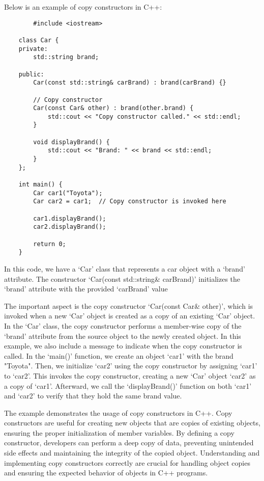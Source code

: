 \begin{solution}
    Below is an example of copy constructors in C++:
    
    \horizontalline
    
    \begin{verbatim}   
        #include <iostream>
    
    class Car {
    private:
        std::string brand;
    
    public:
        Car(const std::string& carBrand) : brand(carBrand) {}
    
        // Copy constructor
        Car(const Car& other) : brand(other.brand) {
            std::cout << "Copy constructor called." << std::endl;
        }
    
        void displayBrand() {
            std::cout << "Brand: " << brand << std::endl;
        }
    };
    
    int main() {
        Car car1("Toyota");
        Car car2 = car1;  // Copy constructor is invoked here
    
        car1.displayBrand();
        car2.displayBrand();
    
        return 0;
    }
        \end{verbatim}
    
    \horizontalline
    
    In this code, we have a `Car' class that represents a car object with a `brand' attribute. The constructor `Car(const std::string\& carBrand)' initializes the `brand' attribute with the provided `carBrand' value
    
    The important aspect is the copy constructor `Car(const Car\& other)', which is invoked when a new `Car' object is created as a copy of an existing `Car' object. In the `Car' class, the copy constructor performs a member-wise copy of the `brand' attribute 
    from the source object to the newly created object. In this example, we also include a message to indicate when the copy constructor is called. In the `main()' function, we create an object `car1' with the brand "Toyota". Then, we initialize `car2' using 
    the copy constructor by assigning `car1' to `car2'. This invokes the copy constructor, creating a new `Car' object `car2' as a copy of `car1'. Afterward, we call the `displayBrand()' function on both `car1' and `car2' to verify that they hold the same brand value.
    
    The example demonstrates the usage of copy constructors in C++. Copy constructors are useful for creating new objects that are copies of existing objects, ensuring the proper initialization of member variables. By defining a copy constructor, developers 
    can perform a deep copy of data, preventing unintended side effects and maintaining the integrity of the copied object. Understanding and implementing copy constructors correctly are crucial for handling object copies and ensuring the expected behavior of 
    objects in C++ programs.
\end{solution}

